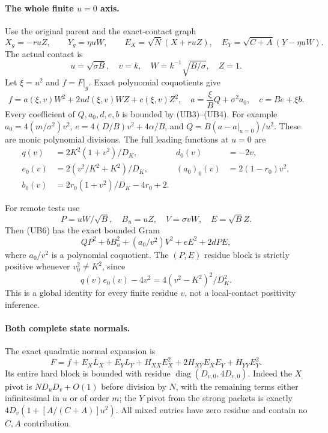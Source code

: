 \paragraph{The whole finite $u=0$ axis.}
Use the original parent and the exact-contact graph
\[
 X_g=-ruZ,\qquad Y_g=\eta uW,
 \qquad E_X=\sqrt N(X+ruZ),\quad
 E_Y=\sqrt{C+A}(Y-\eta uW).                          \tag{UB5}
\]
The actual contact is
\[
 u=\sqrt{\sigma B},\quad v=k,\quad
 W=k^{-1}\sqrt{B/\sigma},\quad Z=1.
\]
Let $\xi=u^2$ and $f=F|_g$.  Exact polynomial coquotients give
\[
 f=a(\xi,v)W^2+2u d(\xi,v)WZ+c(\xi,v)Z^2,
 \quad a=\frac\xi B Q+\sigma^2a_0,\quad c=B e+\xi b.
                                                               \tag{UB6}
\]
Every coefficient of $Q,a_0,d,e,b$ is bounded by (UB3)--(UB4).
For example $a_0=4(m/\sigma^2)v^2$,
$e=4(D/B)v^2+4\alpha/B$, and
$Q=B(a-a|_{u=0})/u^2$.  These are monic polynomial divisions.
The full leading functions at $u=0$ are
\begin{align*}
 q(v)&=2K^2(1+v^2)/D_K,& d_0(v)&=-2v,\\
 e_0(v)&=2(v^2/K^2+K^2)/D_K,&
 (a_0)_0(v)&=2(1-r_0)v^2,\\
 b_0(v)&=2r_0(1+v^2)/D_K-4r_0+2.                  \tag{UB7}
\end{align*}

For remote tests use
\[
 P=uW/\sqrt B,\quad B_u=uZ,\quad
 V=\sigma vW,\quad E=\sqrt B Z.
\]
Then (UB6) has the exact bounded Gram
\[
 QP^2+b B_u^2+(a_0/v^2)V^2+eE^2+2dPE,             \tag{UB8}
\]
where $a_0/v^2$ is a polynomial coquotient.  The $(P,E)$ residue
block is strictly positive whenever $v_0^2\ne K^2$, since
\[
 q(v)e_0(v)-4v^2=4(v^2-K^2)^2/D_K^2.               \tag{UB9}
\]
This is a global identity for every finite residue $v$, not a
local-contact positivity inference.

\paragraph{Both complete state normals.}
The exact quadratic normal expansion is
\[
 F=f+E_X L_X+E_Y L_Y+H_{XX}E_X^2
                       +2H_{XY}E_XE_Y+H_{YY}E_Y^2.
                                                               \tag{UB10}
\]
Its entire hard block is bounded with residue
$\operatorname{diag}(D_{v,0},4D_{v,0})$.
Indeed the $X$ pivot is $ND_uD_v+O(1)$ before division by $N$,
with the remaining terms either infinitesimal in $u$ or of order
$m$; the $Y$ pivot from the strong packets is exactly
$4D_v(1+[A/(C+A)]u^2)$.  All mixed entries have zero residue and
contain no $C,A$ contribution.

